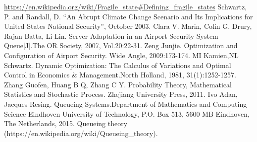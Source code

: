 \documentclass{mcmthesis}
\begin{document}
\begin{thebibliography}{99}
\url{https://en.wikipedia.org/wiki/Fragile_state#Defining_fragile_states}
Schwartz, P. and Randall, D. “An Abrupt Climate Change Scenario and Its Implications for United States National Security”, October 2003.
Clara V. Marin, Colin G. Drury, Rajan Batta, Li Lin. Server Adaptation in an Airport Security System Queue[J].The OR Society, 2007, Vol.20:22-31.
Zeng Junjie. Optimization and Configuration of Airport Security. Wide Angle, 2009:173-174.
MI Kamien,NL Schwartz. Dynamic Optimization: The Calculus of Variations and Optimal Control in Economics \& Management.North Holland, 1981, 31(1):1252-1257.
Zhang Guofen, Huang B Q, Zhang C Y. Probability Theory, Mathematical Statistics and Stochastic Process. Zhejiang University Press, 2011.
Ivo Adan, Jacques Resing. Queueing Systems.Department of Mathematics and Computing Science Eindhoven University of Technology, P.O. Box 513, 5600 MB Eindhoven, The Netherlands, 2015.
Queueing theory (https://en.wikipedia.org/wiki/Queueing\_theory).
\end{thebibliography}
\end{document}
